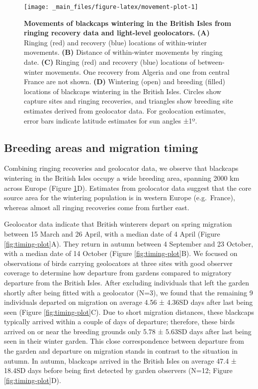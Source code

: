 \documentclass[a4paper, nobind]{templates/ociamthesis}
\begin{document}
\begin{figure}
\texttt{[image: \_main\_files/figure-latex/movement-plot-1]} \caption{\textbf{Movements of blackcaps wintering in the British Isles from ringing recovery data and light-level geolocators.} \textbf{(A)} Ringing (red) and recovery (blue) locations of within-winter movements. \textbf{(B)} Distance of within-winter movements by ringing date. \textbf{(C)} Ringing (red) and recovery (blue) locations of between-winter movements. One recovery from Algeria and one from central France are not shown. \textbf{(D)} Wintering (open) and breeding (filled) locations of blackcaps wintering in the British Isles. Circles show capture sites and ringing recoveries, and triangles show breeding site estimates derived from geolocator data. For geolocation estimates, error bars indicate latitude estimates for sun angles ±1º.}\label{fig:movement-plot}
\end{figure}

\hypertarget{breeding-areas-and-migration-timing}{%
\subsection{Breeding areas and migration timing}\label{breeding-areas-and-migration-timing}}

Combining ringing recoveries and geolocator data, we observe that blackcaps wintering in the British Isles occupy a wide breeding area, spanning 2000 km across Europe (Figure \ref{fig:movement-plot}D). Estimates from geolocator data suggest that the core source area for the wintering population is in western Europe (e.g.~France), whereas almost all ringing recoveries come from further east.

Geolocator data indicate that British winterers depart on spring migration between 15 March and 26 April, with a median date of 4 April (Figure \ref{fig:timing-plot}A). They return in autumn between 4 September and 23 October, with a median date of 14 October (Figure \ref{fig:timing-plot}B). We focused on observations of birds carrying geolocators at three sites with good observer coverage to determine how departure from gardens compared to migratory departure from the British Isles. After excluding individuals that left the garden shortly after being fitted with a geolocator (N=3), we found that the remaining 9 individuals departed on migration on average 4.56 ± 4.36SD days after last being seen (Figure \ref{fig:timing-plot}C). Due to short migration distances, these blackcaps typically arrived within a couple of days of departure; therefore, these birds arrived on or near the breeding grounds only 5.78 ± 5.63SD days after last being seen in their winter garden. This close correspondence between departure from the garden and departure on migration stands in contrast to the situation in autumn. In autumn, blackcaps arrived in the British Isles on average 47.4 ± 18.4SD days before being first detected by garden observers (N=12; Figure \ref{fig:timing-plot}D).
\end{document}
